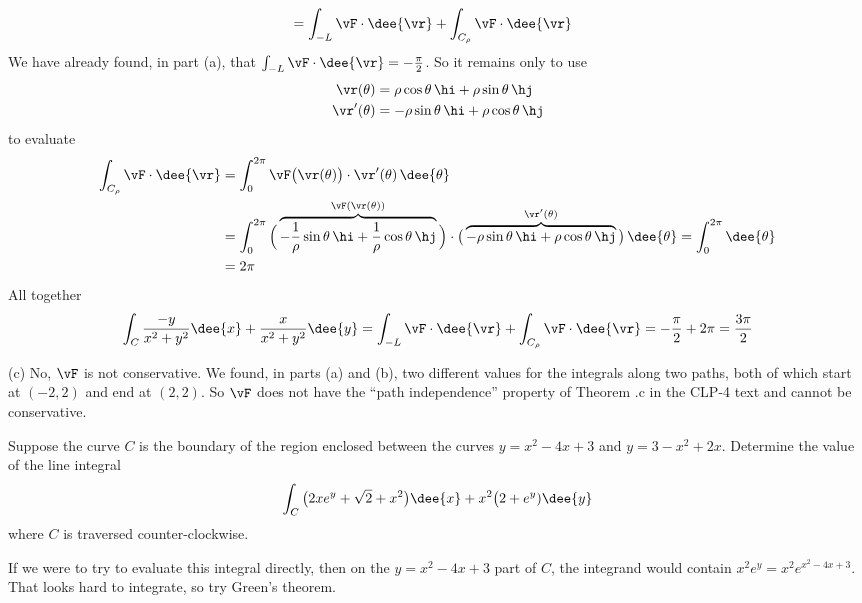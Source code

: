 \begin{solution}
\begin{align*}
&=\int_{-L}\vF\cdot\dee{\vr}
  + \int_{C_\rho}\vF\cdot\dee{\vr}
\end{align*}
We have already found, in part (a), that
$\int_{-L}\vF\cdot\dee{\vr}=-\frac{\pi}{2}$. So it remains only to use
\begin{align*}
\vr(\theta) &= \rho\cos\theta\,\hi +\rho\sin\theta\,\hj \\
\vr'(\theta) &= -\rho\sin\theta\,\hi +\rho\cos\theta\,\hj
\end{align*}
to evaluate
\begin{align*}
\int_{C_\rho}\vF\cdot\dee{\vr}
&=\int_0^{2\pi} \vF\big(\vr(\theta)\big)\cdot\vr'(\theta)\,\dee{\theta} \\
&= \int_0^{2\pi} \Big(\overbrace{-\frac{1}{\rho}\sin\theta\,\hi+\frac{1}{\rho}\cos\theta\,\hj}^
               {\vF(\vr(\theta))}\Big)
 \cdot\big(\overbrace{-\rho\sin\theta\,\hi +\rho\cos\theta\,\hj}^
                     {\vr'(\theta)}\big)\,\dee{\theta}
=\int_0^{2\pi}\dee{\theta} \\
&=2\pi
\end{align*}
All together
\begin{equation*}
\int_C \frac{-y}{x^2+y^2}\dee{x} + \frac{x}{x^2+y^2}\dee{y}
=\int_{-L}\vF\cdot\dee{\vr}
  + \int_{C_\rho}\vF\cdot\dee{\vr}
=-\frac{\pi}{2} +2\pi
=\frac{3\pi}{2}
\end{equation*}

(c) No, $\vF$ is not conservative. We found, in parts (a) and (b),
two different values for the integrals along two paths, both of which start
at $(-2,2)$ and end at $(2,2)$. So $\vF$ does not have the
``path independence'' property of Theorem .c
in the CLP-4 text and cannot be conservative.
\end{solution}

\begin{question}[M317 2012J] %
Suppose the curve $C$ is the boundary of the region enclosed between
the curves $y = x^2 - 4x + 3$ and $y = 3 - x^2 + 2x$. Determine the
value of the line integral
\begin{equation*}
\int_C \big(2xe^y + \sqrt{2} + x^2\big)\dee{x}
      + x^2 \big(2 + e^y)\dee{y}
\end{equation*}
where $C$ is traversed counter-clockwise.
\end{question}

\begin{hint}
If we were to try to evaluate this integral directly, then on the
$y=x^2-4x+3$ part of $C$, the
integrand would contain $x^2 e^y = x^2 e^{x^2-4x+3}$. That looks hard to integrate, so try Green's theorem.
\end{hint}

